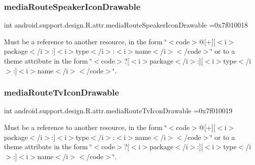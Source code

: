 \subsubsection{\texorpdfstring{media\+Route\+Speaker\+Icon\+Drawable}{mediaRouteSpeakerIconDrawable}}
{\footnotesize\ttfamily int android.\+support.\+design.\+R.\+attr.\+media\+Route\+Speaker\+Icon\+Drawable =0x7f010018\hspace{0.3cm}{\ttfamily [static]}}

Must be a reference to another resource, in the form \char`\"{}$<$code$>$@\mbox{[}+\mbox{]}\mbox{[}$<$i$>$package$<$/i$>$\+:\mbox{]}$<$i$>$type$<$/i$>$\+:$<$i$>$name$<$/i$>$$<$/code$>$\char`\"{} or to a theme attribute in the form \char`\"{}$<$code$>$?\mbox{[}$<$i$>$package$<$/i$>$\+:\mbox{]}\mbox{[}$<$i$>$type$<$/i$>$\+:\mbox{]}$<$i$>$name$<$/i$>$$<$/code$>$\char`\"{}. \mbox{\label{classandroid_1_1support_1_1design_1_1R_1_1attr_a9b0e6cfc3639a928ff4e7c4311fb951a}} 
\subsubsection{\texorpdfstring{media\+Route\+Tv\+Icon\+Drawable}{mediaRouteTvIconDrawable}}
{\footnotesize\ttfamily int android.\+support.\+design.\+R.\+attr.\+media\+Route\+Tv\+Icon\+Drawable =0x7f010019\hspace{0.3cm}{\ttfamily [static]}}

Must be a reference to another resource, in the form \char`\"{}$<$code$>$@\mbox{[}+\mbox{]}\mbox{[}$<$i$>$package$<$/i$>$\+:\mbox{]}$<$i$>$type$<$/i$>$\+:$<$i$>$name$<$/i$>$$<$/code$>$\char`\"{} or to a theme attribute in the form \char`\"{}$<$code$>$?\mbox{[}$<$i$>$package$<$/i$>$\+:\mbox{]}\mbox{[}$<$i$>$type$<$/i$>$\+:\mbox{]}$<$i$>$name$<$/i$>$$<$/code$>$\char`\"{}. \mbox{\label{classandroid_1_1support_1_1design_1_1R_1_1attr_af8dccc21578a5e68732ac4a904297821}} 
